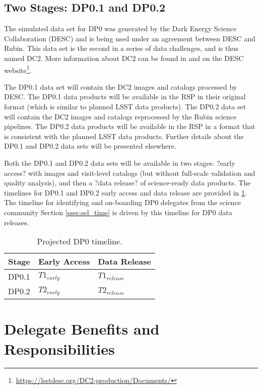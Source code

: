 \documentclass[DM,authoryear,toc]{lsstdoc}
\begin{document}
\subsection{Two Stages: DP0.1 and DP0.2}\label{ssec:intro_stages}

The simulated data set for DP0 was generated by the Dark Energy Science Collaboration (DESC) and is being used under an agreement between DESC and Rubin.
This data set is the second in a series of data challenges, and is thus named DC2.
More information about DC2 can be found in \citet{2020arXiv201005926L} and on the DESC website\footnote{\url{https://lsstdesc.org/DC2-production/Documents/}}.

The DP0.1 data set will contain the DC2 images and catalogs processed by DESC.
The DP0.1 data products will be available in the RSP in their original format (which is similar to planned LSST data products).
The DP0.2 data set will contain the DC2 images and catalogs reprocessed by the Rubin science pipelines.
The DP0.2 data products will be available in the RSP in a format that is consistent with the planned LSST data products.
Further details about the DP0.1 and DP0.2 data sets will be presented elsewhere.

Both the DP0.1 and DP0.2 data sets will be available in two stages: ?early access? with images and visit-level catalogs (but without full-scale validation and quality analysis), and then a ?data release? of science-ready data products. 
The timelines for DP0.1 and DP0.2 early access and data release are provided in \ref{tab:dp0_timeline}. The timeline for identifying and on-boarding DP0 delegates from the science community Section \ref{ssec:sel_time} is driven by this timeline for DP0 data releases.

\begin{table}
\centering
\caption{Projected DP0 timeline.}\label{tab:dp0_timeline}
\begin{tabular}{lll}
\hline
Stage & Early Access & Data Release \\
\hline \hline
DP0.1 & $T1_{early}$ & $T1_{release}$ \\
DP0.2 & $T2_{early}$ & $T2_{release}$ \\
\hline
\end{tabular}
\end{table}


\section{Delegate Benefits and Responsibilities}\label{sec:del}
\end{document}
